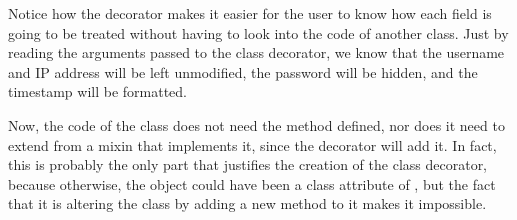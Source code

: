 \documentclass[a4paper,10pt,english]{sphinxmanual}
\begin{document}
\begin{sphinxVerbatim}[commandchars=\\\{\}]
      
         
             

          
     

 
         
          
          
          
          
\end{sphinxVerbatim}

Notice how the decorator makes it easier for the user to know how each field is going to be
treated without having to look into the code of another class. Just by reading the arguments
passed to the class decorator, we know that the username and IP address will be left
unmodified, the password will be hidden, and the timestamp will be formatted.

Now, the code of the class does not need the  method defined, nor does it
need to extend from a mixin that implements it, since the decorator will add it. In fact, this
is probably the only part that justifies the creation of the class decorator, because otherwise,
the  object could have been a class attribute of , but the fact
that it is altering the class by adding a new method to it makes it impossible.
\end{document}
